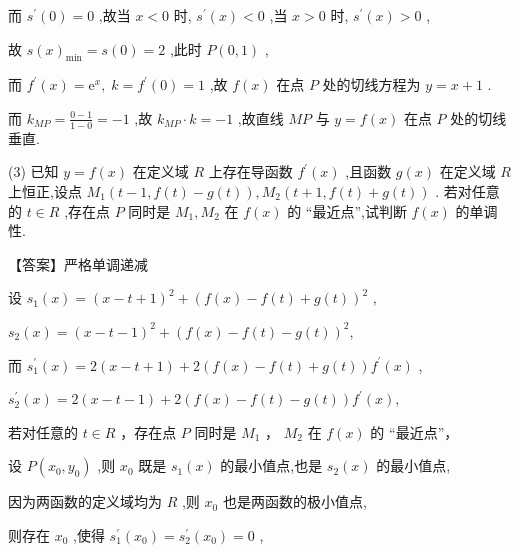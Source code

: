 \documentclass[10pt]{article}
\begin{document}
而 \({s}^{\prime }\left( 0\right)  = 0\) ,故当 \(x < 0\) 时, \({s}^{\prime }\left( x\right)  < 0\) ,当 \(x > 0\) 时, \({s}^{\prime }\left( x\right)  > 0\) ,

故 \(s{\left( x\right) }_{\min } = s\left( 0\right)  = 2\) ,此时 \(P\left( {0,1}\right)\) ,

而 \({f}^{\prime }\left( x\right)  = {\mathrm{e}}^{x},\;k = {f}^{\prime }\left( 0\right)  = 1\) ,故 \(f\left( x\right)\) 在点 \(P\) 处的切线方程为 \(y = x + 1\) .

而 \({k}_{MP} = \frac{0 - 1}{1 - 0} =  - 1\) ,故 \({k}_{MP} \cdot  k =  - 1\) ,故直线 \({MP}\) 与 \(y = f\left( x\right)\) 在点 \(P\) 处的切线垂直.

(3) 已知 \(y = f\left( x\right)\) 在定义域 \(R\) 上存在导函数 \({f}^{\prime }\left( x\right)\) ,且函数 \(g\left( x\right)\) 在定义域 \(R\) 上恒正,设点 \({M}_{1}\left( {t - 1,f\left( t\right)  - g\left( t\right) }\right) ,{M}_{2}\left( {t + 1,f\left( t\right)  + g\left( t\right) }\right)\) . 若对任意的 \(t \in  R\) ,存在点 \(P\) 同时是 \({M}_{1},{M}_{2}\) 在 \(f\left( x\right)\) 的 “最近点”,试判断 \(f\left( x\right)\) 的单调性.

【答案】严格单调递减

设 \({s}_{1}\left( x\right)  = {\left( x - t + 1\right) }^{2} + {\left( f\left( x\right)  - f\left( t\right)  + g\left( t\right) \right) }^{2}\) ,

\({s}_{2}\left( x\right)  = {\left( x - t - 1\right) }^{2} + {\left( f\left( x\right)  - f\left( t\right)  - g\left( t\right) \right) }^{2},\)

而 \({s}_{1}^{\prime }\left( x\right)  = 2\left( {x - t + 1}\right)  + 2\left( {f\left( x\right)  - f\left( t\right)  + g\left( t\right) }\right) {f}^{\prime }\left( x\right)\) ,

\({s}_{2}^{\prime }\left( x\right)  = 2\left( {x - t - 1}\right)  + 2\left( {f\left( x\right)  - f\left( t\right)  - g\left( t\right) }\right) {f}^{\prime }\left( x\right) ,\)

若对任意的 \(t \in  R\) ，存在点 \(P\) 同时是 \({M}_{1}\) ， \({M}_{2}\) 在 \(f\left( x\right)\) 的 “最近点”，

设 \(P\left( {{x}_{0},{y}_{0}}\right)\) ,则 \({x}_{0}\) 既是 \({s}_{1}\left( x\right)\) 的最小值点,也是 \({s}_{2}\left( x\right)\) 的最小值点,

因为两函数的定义域均为 \(R\) ,则 \({x}_{0}\) 也是两函数的极小值点,

则存在 \({x}_{0}\) ,使得 \({s}_{1}^{\prime }\left( {x}_{0}\right)  = {s}_{2}^{\prime }\left( {x}_{0}\right)  = 0\) ,
\end{document}
